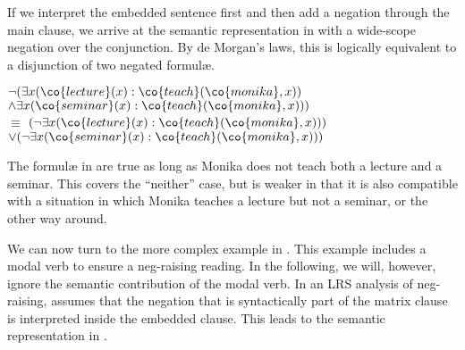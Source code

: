 \documentclass[output=paper]{langsci/langscibook}
\begin{document}




If we interpret the embedded sentence first and then add a negation through the main clause, we arrive at the semantic representation in  with a wide-scope negation over the conjunction. 
By de Morgan's laws, this is logically equivalent to
 a disjunction of two negated formul\ae.

\ea \label{notEX-bi-lf}
$\lnot (\exists x (\co{lecture}(x) : \co{teach}(\co{monika},x))$\\
\hspace*{\fill}
$\land \exists x (\co{seminar}(x) : \co{teach}(\co{monika},x)))$\\
$\equiv$
$(\lnot \exists x (\co{lecture}(x) : \co{teach}(\co{monika},x)))$\\
\hspace*{\fill} $\lor (\lnot \exists x (\co{seminar}(x) : \co{teach}(\co{monika},x)))$
\z 
 
The formul\ae{} in  are true as long as Monika does not teach both a lecture and a seminar. This covers the ``neither'' case, but is weaker in that it is also compatible with a situation in which Monika teaches a lecture but not a seminar, or the other way around.

We can now turn to the more complex example in . 
This example includes a modal verb to ensure a neg-raising reading. 
In the following, we will, however, ignore the semantic contribution of the modal verb.
In an LRS analysis of neg-raising, \citet{Sailer:05cssp} assumes that the negation that is syntactically part of the matrix clause is interpreted inside the embedded clause. This leads to the semantic representation in .%
\end{document}

